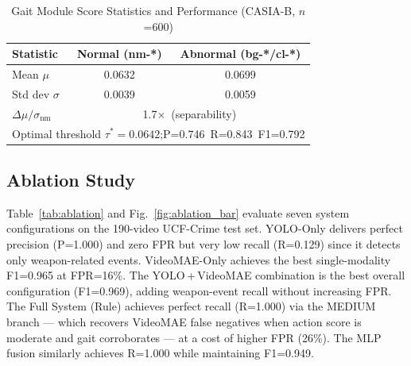 \documentclass[conference]{IEEEtran}
\begin{document}
\begin{table}[h]
\caption{Gait Module Score Statistics and Performance (CASIA-B, $n$=600)}
\label{tab:gait}
\centering
\begin{tabular}{lcc}
\toprule
\textbf{Statistic} & \textbf{Normal (nm-*)} & \textbf{Abnormal (bg-*/cl-*)}\\
\midrule
Mean $\mu$           & 0.0632 & 0.0699\\
Std dev $\sigma$     & 0.0039 & 0.0059\\
$\Delta\mu / \sigma_\text{nm}$ & \multicolumn{2}{c}{1.7$\times$\ (separability)}\\
\midrule
\multicolumn{3}{l}{Optimal threshold $\tau^*=0.0642$;\quad P=0.746\ R=0.843\ F1=0.792}\\
\bottomrule
\end{tabular}
\end{table}

\subsection{Ablation Study}

Table~\ref{tab:ablation} and Fig.~\ref{fig:ablation_bar} evaluate seven system configurations on the
190-video UCF-Crime test set.
YOLO-Only delivers perfect precision (P=1.000) and zero FPR but very low
recall (R=0.129) since it detects only weapon-related events.
VideoMAE-Only achieves the best single-modality F1=0.965 at FPR=16\%.
The YOLO\,+\,VideoMAE combination is the best overall configuration
(F1=0.969), adding weapon-event recall without increasing FPR.
The Full System (Rule) achieves perfect recall (R=1.000) via the MEDIUM
branch — which recovers VideoMAE false negatives when action score is
moderate and gait corroborates — at a cost of higher FPR (26\%).
The MLP fusion similarly achieves R=1.000 while maintaining F1=0.949.
\end{document}
